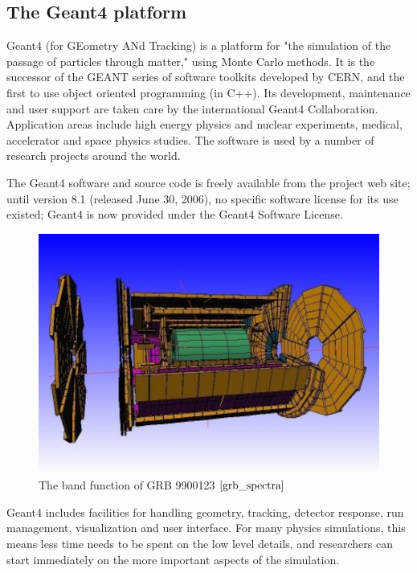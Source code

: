 \documentclass[12pt, a4paper,titlepage]{article}
\numberwithin{equation}{section}
\numberwithin{figure}{section}
\begin{document}
\subsection{The Geant4 platform}

Geant4 \cite{geant1, geant2, geant3} (for GEometry ANd Tracking) is a platform for "the simulation of the passage of particles through matter," using Monte Carlo methods. It is the successor of the GEANT series of software toolkits developed by CERN, and the first to use object oriented programming (in C++). Its development, maintenance and user support are taken care by the international Geant4 Collaboration. Application areas include high energy physics and nuclear experiments, medical, accelerator and space physics studies. The software is used by a number of research projects around the world.

The Geant4 software and source code is freely available from the project web site; until version 8.1 (released June 30, 2006), no specific software license for its use existed; Geant4 is now provided under the Geant4 Software License.

\begin{figure}[H]
\centering
\includegraphics[width=130.0mm]{images/AtlasHalf.jpg}
\caption{The band function of GRB 9900123 $\cite{grb_spectra}$}
\end{figure}

Geant4 includes facilities for handling geometry, tracking, detector response, run management, visualization and user interface. For many physics simulations, this means less time needs to be spent on the low level details, and researchers can start immediately on the more important aspects of the simulation.
\end{document}
